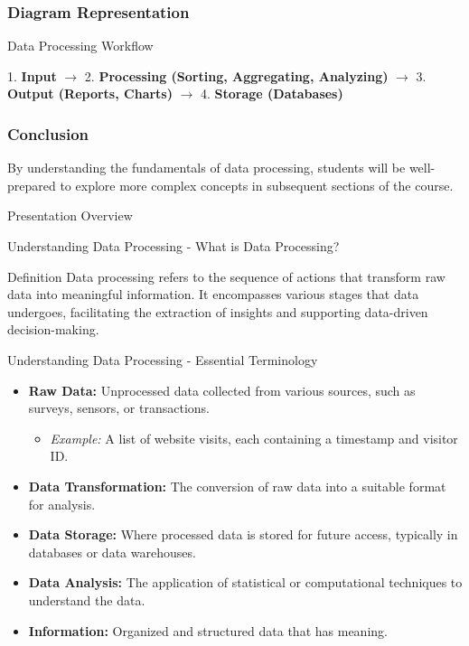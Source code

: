 \documentclass[aspectratio=169]{beamer}
\begin{document}
\begin{frame}[fragile]
    \frametitle{Diagram Representation}
    \begin{block}{Data Processing Workflow}
        \begin{center}
        1. \textbf{Input} $\rightarrow$ 2. \textbf{Processing (Sorting, Aggregating, Analyzing)} $\rightarrow$ 3. \textbf{Output (Reports, Charts)} $\rightarrow$ 4. \textbf{Storage (Databases)}
        \end{center}
    \end{block}
\end{frame}

\begin{frame}[fragile]
    \frametitle{Conclusion}
    By understanding the fundamentals of data processing, students will be well-prepared to explore more complex concepts in subsequent sections of the course.
\end{frame}

\begin{frame}[fragile]{Presentation Overview}
  \tableofcontents[hideallsubsections]
\end{frame}

\begin{frame}[fragile]{Understanding Data Processing - What is Data Processing?}
    \begin{block}{Definition}
        Data processing refers to the sequence of actions that transform raw data into meaningful information. It encompasses various stages that data undergoes, facilitating the extraction of insights and supporting data-driven decision-making.
    \end{block}
\end{frame}

\begin{frame}[fragile]{Understanding Data Processing - Essential Terminology}
    \begin{itemize}
        \item \textbf{Raw Data:} Unprocessed data collected from various sources, such as surveys, sensors, or transactions.
        \begin{itemize}
            \item \textit{Example:} A list of website visits, each containing a timestamp and visitor ID.
        \end{itemize}
        \item \textbf{Data Transformation:} The conversion of raw data into a suitable format for analysis.
        \item \textbf{Data Storage:} Where processed data is stored for future access, typically in databases or data warehouses.
        \item \textbf{Data Analysis:} The application of statistical or computational techniques to understand the data.
        \item \textbf{Information:} Organized and structured data that has meaning.
    \end{itemize}
\end{frame}
\end{document}
